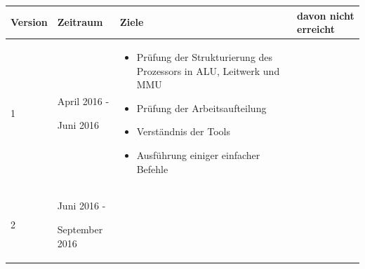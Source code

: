 \begin{table}[H]
\begin{tabular}{|p{45pt}|p{80pt}|p{220pt}|p{115pt}|}
\hline
Version                                  & Zeitraum                                 & Ziele                                                                      & davon nicht erreicht                     \\
\hline
\begin{description}[noitemsep,topsep=0pt]
\item 1
\end{description}                        & \begin{description}[noitemsep,topsep=0pt]
                                           \item April 2016 -
                                           \item Juni 2016
                                           \end{description}                        & \begin{itemize}[noitemsep,topsep=0pt]
                                                                                      \item Pr\"ufung der Strukturierung des Prozessors in ALU, Leitwerk und MMU
                                                                                      \item Pr\"ufung der Arbeitsaufteilung
                                                                                      \item Verst\"andnis der Tools
                                                                                      \item Ausf\"uhrung einiger einfacher Befehle
                                                                                      \end{itemize}                                                              &                                          \\
\hline
\begin{description}[noitemsep,topsep=0pt]
\item 2
\end{description}                        & \begin{description}[noitemsep,topsep=0pt]
                                           \item Juni 2016 -
                                           \item September 2016
                                           \end{description}                        & \begin{itemize}[noitemsep,topsep=0pt,itemindent=0pt]

\end{itemize}
\end{tabular}
\end{table}
